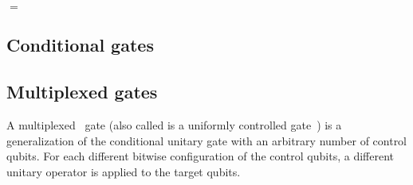 \begin{center}
$=$
\end{center}


\subsection{Conditional gates}

\subsection{Multiplexed gates}
A multiplexed~\cite{???,???,???} gate (also called is a uniformly controlled gate~\cite{???,???}) is a generalization of the conditional unitary gate with an arbitrary number of control qubits. For each different bitwise configuration of the control qubits, a different unitary operator is applied to the target qubits.


